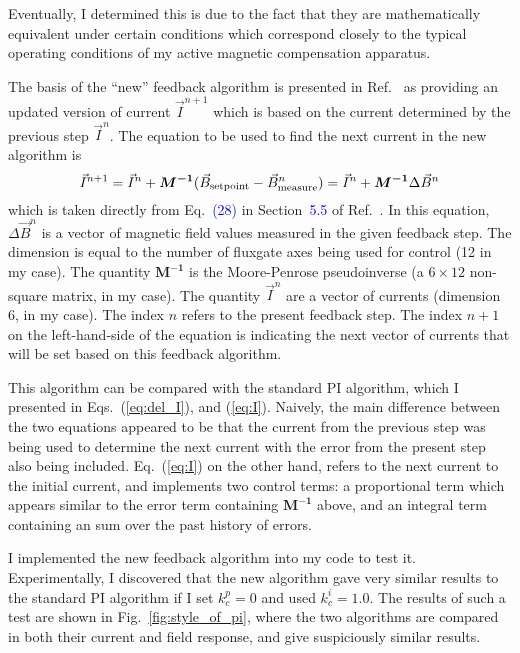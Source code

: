 Eventually, I determined this is due to the fact that they are
mathematically equivalent under certain conditions which correspond
closely to the typical operating conditions of my active magnetic
compensation apparatus.

The basis of the ``new'' feedback algorithm is presented in
Ref.~\cite{rawlik} as providing an updated version of current
$\vec{I}^{n+1}$ which is based on the current determined by the previous
step $\vec{I}^{n}$.  The equation to be used to find the next current in the
new algorithm is
\begin{equation}\label{eq:I_raw}
    \vec{I}^{n+1}= \vec{I}^{n}+\bm{M^{-1}} (\vec{B}_{\rm setpoint}-\vec{B}_{\rm
    measure}^n)=\vec{I}^{n}+\bm{M^{-1}} \Delta  \vec{B}^{n}
\end{equation}
which is taken directly from Eq.~\textcolor{blue}{(28)} in Section~\textcolor{blue}{5.5} of
Ref.~\cite{rawlik}. In this equation, $\Delta  \vec{B}^{n}$ is a vector of
magnetic field values measured in the given feedback step.  The
dimension is equal to the number of fluxgate axes being used for
control (12 in my case).  The quantity $\bm{M^{-1}}$ is the Moore-Penrose
pseudoinverse (a $6\times 12$ non-square matrix, in my case).  The
quantity $\vec{I}^{n}$ are a vector of currents (dimension 6, in my case).
The index $n$ refers to the present feedback step.
The index $n+1$ on the left-hand-side of the equation is indicating
the next vector of currents that will be set based on this feedback
algorithm.

This algorithm can be compared with the standard PI algorithm, which I
presented in Eqs.~(\ref{eq:del_I}), and (\ref{eq:I}).  Naively, the main
difference between the two equations appeared to be that the current
from the previous step was being used to determine the next current
with the error from the present step also being included.
Eq.~(\ref{eq:I}) on the other hand, refers to the next current to
the initial current, and implements two control terms: a proportional
term which appears similar to the error term containing $\bm{M^{-1}}$
above, and an integral term containing an sum over the past history of
errors.


I implemented the new feedback algorithm into my code to test it.
Experimentally, I discovered that the new algorithm gave very similar
results to the standard PI algorithm if I set $k_c^p=0$ and used
$k_c^i=1.0$.  The results of such a test are shown in
Fig.~\ref{fig:style_of_pi}, where the two algorithms are compared in
both their current and field response, and give suspiciously similar
results.


